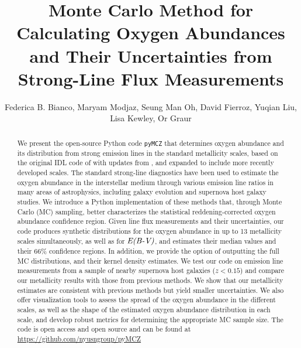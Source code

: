 \documentclass{emulateapj}
\newcommand{\ebmv}{\ensuremath{\mathrm{\emph{E(B-V)}}}}
\begin{document}
\title{Monte Carlo Method for Calculating Oxygen Abundances and Their Uncertainties from Strong-Line Flux Measurements}

\author{Federica B. Bianco, Maryam Modjaz, Seung Man Oh, David Fierroz, Yuqian Liu, Lisa Kewley, Or Graur}
 
 
\begin{abstract}
We present the open-source Python code \verb=pyMCZ= that determines oxygen abundance and its distribution from strong emission lines in the standard metallicity scales, based on the original IDL code of \citet{kewley02} with updates from \citet{kewley08}, and expanded to include more recently developed scales. 
The standard strong-line diagnostics have been used to estimate the oxygen abundance in the interstellar medium through various emission line ratios in many areas of astrophysics, including galaxy evolution and supernova host galaxy studies.
We introduce a Python implementation of these methods that, through Monte Carlo (MC) sampling, better characterizes the statistical reddening-corrected oxygen abundance confidence region. Given line flux measurements and their uncertainties, our code produces synthetic distributions for the oxygen abundance in up to 13 metallicity scales simultaneously, 
as well as for \ebmv, 
and estimates their median values and their 66\%  confidence regions. In addition, we provide the option of outputting the full MC distributions, and their kernel density estimates. 
We test our code on emission line measurements from a sample of nearby supernova host galaxies ($z<0.15$) and compare our metallicity results with those from previous methods. We show that our metallicity estimates are consistent with previous methods but yield smaller uncertainties. 
We also offer visualization tools to assess the spread of the oxygen abundance in the different scales, as well as the shape of the estimated oxygen abundance distribution in each scale, and develop robust metrics for determining the appropriate MC sample size. 
The code is open access and open source 
and can be found at \url{https://github.com/nyusngroup/pyMCZ}
\end{abstract}
\end{document}
